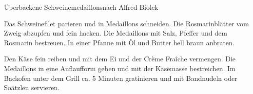 \begin{recipe}{Überbackene Schweinemedaillons}{nach Alfred Biolek}
  \label{Schweinemedaillons}
  \inglist

  \steps
  Das Schweinefilet parieren und in Medaillons schneiden. Die Rosmarinblätter
  vom Zweig abzupfen und fein hacken. Die Medaillons mit Salz, Pfeffer und dem
  Rosmarin bestreuen. In einer Pfanne mit Öl und Butter hell braun anbraten.

  Den Käse fein reiben und mit dem Ei und der Crème Fraîche vermengen. Die
  Medaillons in eine Auflaufform geben und mit der Käsemasse bestreichen. Im
  Backofen unter dem Grill ca. 5 Minuten gratinieren und mit Bandnudeln oder
  Soätzlen servieren.
\end{recipe}